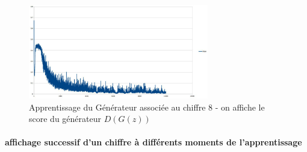 \begin{figure}[ht!]
\begin{center}
\includegraphics[width=0.7\textwidth]{images/18_01_12-GAN/courbe.png}\caption{Apprentissage du Générateur associée au chiffre 8 - on affiche le score du générateur $D(G(z))$}
\end{center}
\end{figure}

\paragraph{affichage successif d'un chiffre à différents moments de l'apprentissage}

